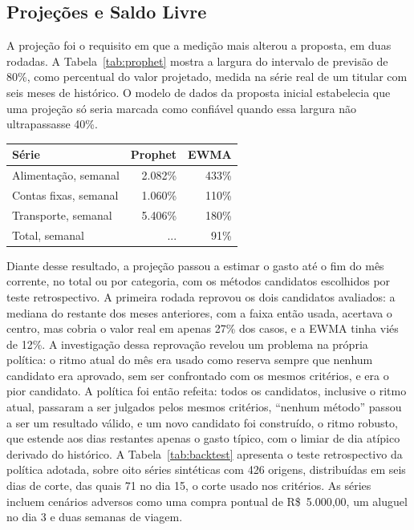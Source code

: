 \subsection{Projeções e Saldo Livre}

A projeção foi o requisito em que a medição mais alterou a proposta, em duas rodadas. A Tabela~\ref{tab:prophet} mostra a largura do intervalo de previsão de 80\%, como percentual do valor projetado, medida na série real de um titular com seis meses de histórico. O modelo de dados da proposta inicial estabelecia que uma projeção só seria marcada como confiável quando essa largura não ultrapassasse 40\%.

\begin{tabela}[H]
\centering
\caption{Largura do intervalo de previsão como percentual do valor projetado}
\label{tab:prophet}
\begin{tabular}{lrr}
\toprule
\textbf{Série} & \textbf{Prophet} & \textbf{EWMA} \\
\midrule
Alimentação, semanal & 2.082\% & 433\% \\
Contas fixas, semanal & 1.060\% & 110\% \\
Transporte, semanal & 5.406\% & 180\% \\
Total, semanal & ... & 91\% \\
\bottomrule
\end{tabular}
\authorssource
\end{tabela}

Diante desse resultado, a projeção passou a estimar o gasto até o fim do mês corrente, no total ou por categoria, com os métodos candidatos escolhidos por teste retrospectivo. A primeira rodada reprovou os dois candidatos avaliados: a mediana do restante dos meses anteriores, com a faixa então usada, acertava o centro, mas cobria o valor real em apenas 27\% dos casos, e a EWMA tinha viés de 12\%. A investigação dessa reprovação revelou um problema na própria política: o ritmo atual do mês era usado como reserva sempre que nenhum candidato era aprovado, sem ser confrontado com os mesmos critérios, e era o pior candidato. A política foi então refeita: todos os candidatos, inclusive o ritmo atual, passaram a ser julgados pelos mesmos critérios, ``nenhum método'' passou a ser um resultado válido, e um novo candidato foi construído, o ritmo robusto, que estende aos dias restantes apenas o gasto típico, com o limiar de dia atípico derivado do histórico. A Tabela~\ref{tab:backtest} apresenta o teste retrospectivo da política adotada, sobre oito séries sintéticas com 426 origens, distribuídas em seis dias de corte, das quais 71 no dia 15, o corte usado nos critérios. As séries incluem cenários adversos como uma compra pontual de R\$~5.000,00, um aluguel no dia 3 e duas semanas de viagem.

